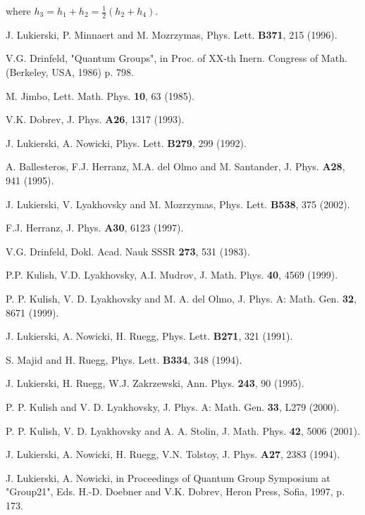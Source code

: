 \documentclass[a4paper,12pt,showkeys]{article}
\begin{document}
where $h_3 = h_1 + h_2 = \frac{1}{2}(h_2 + h_4 )$.



 \begin{thebibliography}{99}

 J. Lukierski, P. Minnaert and M. Mozrzymas, Phys.
 Lett. {\bf B371}, 215 (1996).


  V.G. Drinfeld, "Quantum Groups", in Proc. of XX-th
 Inern. Congress of Math. (Berkeley, USA, 1986) p. 798.



  M. Jimbo, Lett. Math. Phys. {\bf 10}, 63
  (1985).



 V.K. Dobrev, J. Phys. {\bf A26}, 1317 (1993).



 J. Lukierski, A. Nowicki, Phys. Lett. {\bf
B279}, 299 (1992).





  A. Ballesteros, F.J. Herranz, M.A. del Olmo and M.
 Santander, J. Phys. {\bf A28}, 941 (1995).

 J. Lukierski, V. Lyakhovsky and M. Mozrzymas, Phys.
 Lett. {\bf B538}, 375 (2002).


 F.J. Herranz, J. Phys. {\bf A30}, 6123 (1997).

 V.G. Drinfeld, Dokl. Acad. Nauk SSSR {\bf 273}, 531
(1983).


 P.P. Kulish, V.D. Lyakhovsky, A.I. Mudrov,
J. Math. Phys. {\bf 40}, 4569 (1999).


 P. P. Kulish, V. D. Lyakhovsky
 and M. A. del Olmo, J. Phys. A: Math. Gen. {\bf 32}, 8671 (1999).

  J. Lukierski, A. Nowicki, H. Ruegg,
 Phys. Lett. {\bf B271}, 321 (1991).




 S. Majid and H. Ruegg,
 Phys. Lett.  {\bf B334}, 348 (1994).

 J. Lukierski, H. Ruegg, W.J. Zakrzewski, Ann.
 Phys. {\bf 243}, 90 (1995).




 P. P. Kulish and V. D. Lyakhovsky, J. Phys. A: Math. Gen. {\bf %
33}, L279 (2000).

 P. P. Kulish, V. D. Lyakhovsky and A. A. Stolin, J. Math.
Phys. {\bf 42}, 5006 (2001).

 J. Lukierski, A. Nowicki, H. Ruegg, V.N. Tolstoy,
J. Phys. {\bf A27}, 2383 (1994).

 J. Lukierski, A. Nowicki, in Proceedings of Quantum Group
 Symposium at "Group21", Eds. H.-D. Doebner and V.K. Dobrev, Heron Press,
 Sofia, 1997, p. 173.

\end{thebibliography}
\end{document}
